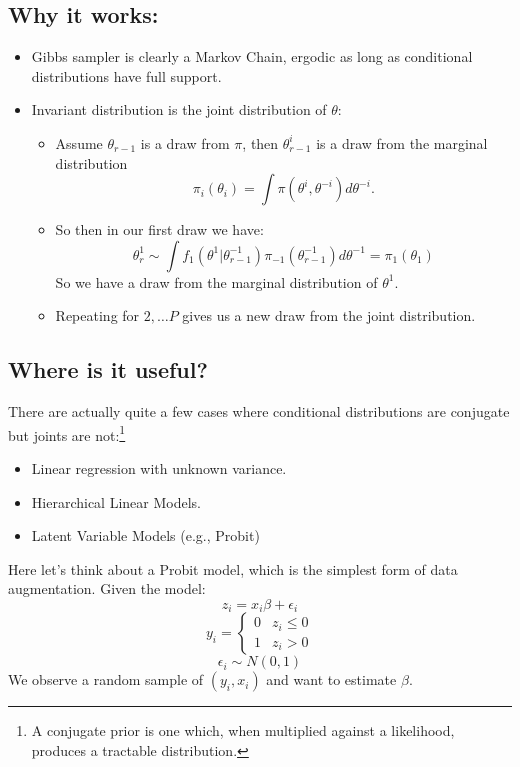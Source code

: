 \documentclass[twoside]{article}
\begin{document}
\subsection{Why it works:} 
\begin{itemize}
\item Gibbs sampler is clearly a Markov Chain, ergodic as long as conditional distributions have full support. 
\item Invariant distribution is the joint distribution of $\theta$: 
\begin{itemize}
\item Assume $\theta_{r-1}$ is a draw from $\pi$, then $\theta_{r-1}^i$ is a draw from the marginal distribution 
$$\pi_i(\theta_i) = \int \pi(\theta^i, \theta^{-i}) d\theta^{-i}.$$
\item So then in our first draw we have: 
$$\theta^1_r \sim \int f_1(\theta^1 | \theta^{-1}_{r-1}) \pi_{-1}(\theta^{-1}_{r-1}) d \theta^{-1} = \pi_1(\theta_1)$$
So we have a draw from the marginal distribution of $\theta^1$. 
\item Repeating for $2, \ldots P$ gives us a new draw from the joint distribution. 
\end{itemize}
\end{itemize}

\subsection{Where is it useful?}

There are actually quite a few cases where conditional distributions are conjugate but joints are not:\footnote{A conjugate prior is one which, when multiplied against a likelihood, produces a tractable distribution.} 
\begin{itemize}
\item Linear regression with unknown variance. 
\item Hierarchical Linear Models. 
\item Latent Variable Models (e.g., Probit) 
\end{itemize}

Here let's think about a Probit model, which is the simplest form of data augmentation. Given the model: 
$$ z_i = x_i \beta + \epsilon_i $$
$$ y_i = \begin{cases} 0 & z_i \leq 0 \\ 1 & z_i > 0 \end{cases}$$
$$ \epsilon_i \sim N(0, 1)$$
We observe a random sample of $(y_i, x_i)$ and want to estimate $\beta$. 
\end{document}
